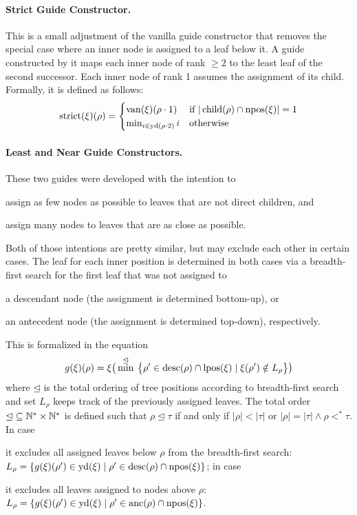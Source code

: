 \documentclass[../../document.tex]{subfiles}
\begin{document}
    \paragraph{Strict Guide Constructor.}
    This is a small adjustment of the vanilla guide constructor that removes the special case where an inner node is assigned to a leaf below it.
    A guide constructed by it maps each inner node of rank \(\ge 2\) to the least leaf of the second successor.
    Each inner node of rank 1 assumes the assignment of its child.
    Formally, it is defined as follows:
    \[
    \mathrm{strict}(\xi)(\rho) = \begin{cases}
        \mathrm{van}(\xi)(\rho \cdot 1) & \text{if $|\operatorname{child}(\rho) \cap \operatorname{npos}(\xi)| = 1$} \\
        \min_{i \in \operatorname{yd}(\rho\cdot 2)} i &\text{otherwise}
    \end{cases}
    \]

    \paragraph{Least and Near Guide Constructors.}
    These two guides were developed with the intention to
    \begin{inparaenum}
        \item assign as few nodes as possible to leaves that are not direct children, and
        \item assign many nodes to leaves that are as close as possible.
    \end{inparaenum}
    Both of those intentions are pretty similar, but may exclude each other in certain cases.
    The leaf for each inner position is determined in both cases via a breadth-first search for the first leaf that was not assigned to
    \begin{inparaenum}
        \item a descendant node (the assignment is determined bottom-up), or
        \item an antecedent node (the assignment is determined top-down), respectively.
    \end{inparaenum}
    This is formalized in the equation
    \[
    g(\xi)(\rho) = \xi\big( \min^{\unlhd} \: \big\{\rho' \in \operatorname{desc}(\rho) \cap \operatorname{lpos}(\xi) \mid \xi(\rho') \notin L_\rho \big\} \big)
    \]
    where \(\unlhd\) is the total ordering of tree positions according to breadth-first search and set \(L_\rho\) keeps track of the previously assigned leaves.
    The total order \(\unlhd \subseteq \mathbb{N}^* \times \mathbb{N}^*\) is defined such that \(\rho \unlhd \tau\) if and only if \(|\rho| < |\tau|\) or \(|\rho| = |\tau| \land \rho <^* \tau\).
    In case
    \begin{inparaenum}
        \item it excludes all assigned leaves below \(\rho\) from the breadth-first search:
        \(L_\rho = \{ g(\xi)(\rho') \in \operatorname{yd}(\xi) \mid \rho' \in \operatorname{desc}(\rho) \cap \operatorname{npos}(\xi) \}\); in case
        \item it excludes all leaves assigned to nodes above \(\rho\):
        \(L_\rho = \{ g(\xi)(\rho') \in \operatorname{yd}(\xi) \mid \rho' \in \operatorname{anc}(\rho) \cap \operatorname{npos}(\xi) \}\).
    \end{inparaenum}
\end{document}
